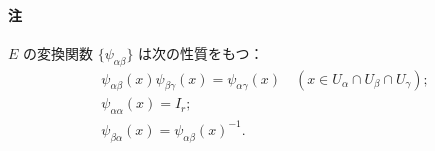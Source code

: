 \documentclass[pandoc,base=10pt,b5j,precisetext]{bxjsarticle}
\let\oldparagraph\paragraph
\renewcommand{\paragraph}[1]{\oldparagraph{#1}\mbox{}}
\begin{document}
\hypertarget{ux6ce8}{%
\paragraph{注}\label{ux6ce8}}

\(E\) の変換関数 \(\{ \psi_{\alpha\beta} \}\) は次の性質をもつ：
\begin{align}
&\psi_{\alpha\beta}(x) \psi_{\beta\gamma}(x) = \psi_{\alpha\gamma}(x)\quad (x \in U_\alpha \cap U_\beta \cap U_\gamma);\\
&\psi_{\alpha\alpha}(x) = I_r;\\
&\psi_{\beta\alpha}(x) = \psi_{\alpha\beta}(x)^{-1}.
\end{align}
\end{document}
